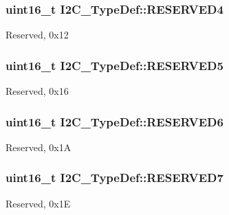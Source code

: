 \subsubsection[{\texorpdfstring{R\+E\+S\+E\+R\+V\+E\+D4}{RESERVED4}}]{\setlength{\rightskip}{0pt plus 5cm}uint16\+\_\+t I2\+C\+\_\+\+Type\+Def\+::\+R\+E\+S\+E\+R\+V\+E\+D4}\hypertarget{struct_i2_c___type_def_a05a1a3482d9534ba9ef976e3277040f0}{}\label{struct_i2_c___type_def_a05a1a3482d9534ba9ef976e3277040f0}
Reserved, 0x12 
\subsubsection[{\texorpdfstring{R\+E\+S\+E\+R\+V\+E\+D5}{RESERVED5}}]{\setlength{\rightskip}{0pt plus 5cm}uint16\+\_\+t I2\+C\+\_\+\+Type\+Def\+::\+R\+E\+S\+E\+R\+V\+E\+D5}\hypertarget{struct_i2_c___type_def_ae736412dcff4daa38bfa8bf8628df316}{}\label{struct_i2_c___type_def_ae736412dcff4daa38bfa8bf8628df316}
Reserved, 0x16 
\subsubsection[{\texorpdfstring{R\+E\+S\+E\+R\+V\+E\+D6}{RESERVED6}}]{\setlength{\rightskip}{0pt plus 5cm}uint16\+\_\+t I2\+C\+\_\+\+Type\+Def\+::\+R\+E\+S\+E\+R\+V\+E\+D6}\hypertarget{struct_i2_c___type_def_aaf1b319262f53669f49e244d94955a60}{}\label{struct_i2_c___type_def_aaf1b319262f53669f49e244d94955a60}
Reserved, 0x1A 
\subsubsection[{\texorpdfstring{R\+E\+S\+E\+R\+V\+E\+D7}{RESERVED7}}]{\setlength{\rightskip}{0pt plus 5cm}uint16\+\_\+t I2\+C\+\_\+\+Type\+Def\+::\+R\+E\+S\+E\+R\+V\+E\+D7}\hypertarget{struct_i2_c___type_def_a0f398bdcc3f24e7547c3cb9343111fd0}{}\label{struct_i2_c___type_def_a0f398bdcc3f24e7547c3cb9343111fd0}
Reserved, 0x1E 
